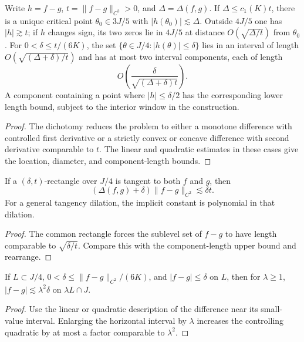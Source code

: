 \begin{lemma}
\label{lem:tangency-sublevels}
Write $h=f-g$, $t=\|f-g\|_{C^2}>0$, and $\Delta=\Delta(f,g)$.
If $\Delta\leq c_1(K)t$, there is a unique critical point
$\theta_0\in3J/5$ with $|h(\theta_0)|\lesssim\Delta$.
Outside $4J/5$ one has $|h|\gtrsim t$; if $h$ changes sign,
its two zeros lie in $4J/5$ at distance
$O(\sqrt{\Delta/t})$ from $\theta_0$.
For $0<\delta\leq t/(6K)$, the set
$\{\theta\in J/4:|h(\theta)|\leq\delta\}$ lies in an
interval of length $O(\sqrt{(\Delta+\delta)/t})$ and has at
most two interval components, each of length
\[
                         O\left(\frac{\delta}{\sqrt{(\Delta+\delta)t}}\right).
\]
A component containing a point where $|h|\leq\delta/2$ has
the corresponding lower length bound, subject to the interior
window in the construction.
\end{lemma}
\begin{proof}
The dichotomy reduces the problem to either a monotone difference
with controlled first derivative or a strictly convex or concave
difference with second derivative comparable to $t$.
The linear and quadratic estimates in these cases give the
location, diameter, and component-length bounds.
\end{proof}

\begin{lemma}
\label{lem:common-tangent}
If a $(\delta,t)$-rectangle over $J/4$ is tangent to both
$f$ and $g$, then
\[
                         (\Delta(f,g)+\delta)\|f-g\|_{C^2}
                                           \lesssim\delta t.
\]
For a general tangency dilation, the implicit constant is
polynomial in that dilation.
\end{lemma}
\begin{proof}
The common rectangle forces the sublevel set of $f-g$ to have
length comparable to $\sqrt{\delta/t}$. Compare this with
the component-length upper bound and rearrange.
\end{proof}

\begin{lemma}
\label{lem:cinematic-interval-growth}
If $L\subset J/4$, $0<\delta\leq\|f-g\|_{C^2}/(6K)$,
and $|f-g|\leq\delta$ on $L$, then for $\lambda\geq1$,
$|f-g|\lesssim\lambda^2\delta$ on $\lambda L\cap J$.
\end{lemma}
\begin{proof}
Use the linear or quadratic description of the difference near
its small-value interval. Enlarging the horizontal interval
by $\lambda$ increases the controlling quadratic by at most
a factor comparable to $\lambda^2$.
\end{proof}

